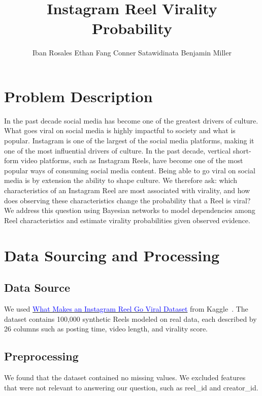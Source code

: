 \documentclass{article}
\title{Instagram Reel Virality Probability}
\author{%
  Iban Rosales
  \And
  Ethan Fang
  \And
  Conner Satawidinata
  \And
  Benjamin Miller
}
\begin{document}
\raggedbottom
\setlength{\intextsep}{6pt}

\maketitle

\section{Problem Description}
  In the past decade social media has become one of the greatest drivers of culture.
  What goes viral on social media is highly impactful to society and what is popular.
  Instagram is one of the largest of the social media platforms, making it one of the
  most influential drivers of culture. In the past decade, vertical short-form video
  platforms, such as Instagram Reels, have become one of the most popular ways of
  consuming social media content. Being able to go viral on social media is by extension
  the ability to shape culture. We therefore ask: which characteristics of an Instagram Reel 
  are most associated with virality, and how does observing these characteristics change the 
  probability that a Reel is viral? We address this question using Bayesian networks to model 
  dependencies among Reel characteristics and estimate virality probabilities given observed evidence.

\section{Data Sourcing and Processing}

\subsection{Data Source}
We used
\href{https://www.kaggle.com/datasets/deepeshkansotia/what-makes-an-instagram-reel-go-viral/data}{\textcolor{blue}{What Makes an Instagram Reel Go Viral Dataset}}
from Kaggle~\citep{kansotia-reels}.
The dataset contains 100,000 synthetic Reels modeled on real data, each
described by 26 columns such as posting time, video length, and virality score.


\subsection{Preprocessing}
We found that the dataset contained no missing values. We excluded features that
were not relevant to answering our question, such as reel\_id and creator\_id.
\end{document}
